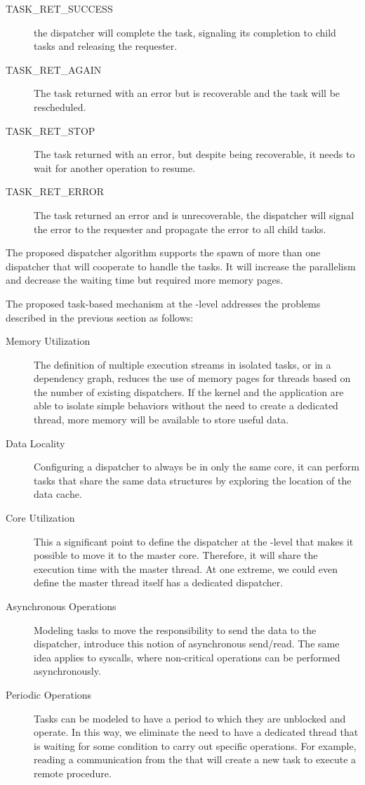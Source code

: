 	\begin{description}
		\item[TASK\_RET\_SUCCESS] the dispatcher will complete the task,
			signaling its completion to child tasks and releasing the
			requester.
		\item[TASK\_RET\_AGAIN] The task returned with an error but is
			recoverable and the task will be rescheduled.
		\item[TASK\_RET\_STOP] The task returned with an error, but despite
			being recoverable, it needs to wait for another operation to
			resume.
		\item[TASK\_RET\_ERROR] The task returned an error and is
			unrecoverable, the dispatcher will signal the error to the
			requester and propagate the error to all child tasks.
	\end{description}

	The proposed dispatcher algorithm supports the spawn of more than one
	dispatcher that will cooperate to handle the tasks. It will increase the
	parallelism and decrease the waiting time but required more memory pages.

	The proposed task-based mechanism at the \os-level addresses the problems
	described in the previous section as follows:
	\begin{description}
		\item[Memory Utilization] The definition of multiple execution streams
			in isolated tasks, or in a dependency graph, reduces the use of
			memory pages for threads based on the number of existing
			dispatchers. If the kernel and the application are able to isolate
			simple behaviors without the need to create a dedicated thread,
			more memory will be available to store useful data.

		\item[Data Locality] Configuring a dispatcher to always be in only the
			same core, it can perform tasks that share the same data structures
			by exploring the location of the data cache.

		\item[Core Utilization] This a significant point to define the
			dispatcher at the \os-level that makes it possible to move it to the
			master core. Therefore, it will share the execution time with the
			master thread. At one extreme, we could even define the master
			thread itself has a dedicated dispatcher.

		\item[Asynchronous Operations] Modeling tasks to move the
			responsibility to send the data to the dispatcher, introduce this
			notion of asynchronous send/read. The same idea applies to
			syscalls, where non-critical operations can be performed
			asynchronously.

		\item[Periodic Operations] Tasks can be modeled to have a period to
			which they are unblocked and operate. In this way, we eliminate the
			need to have a dedicated thread that is waiting for some condition
			to carry out specific operations. For example, reading
			a communication from the \noc that will create a new task to execute
			a remote procedure.
	\end{description}

